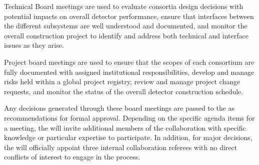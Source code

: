 Technical Board meetings are used to evaluate consortia design
decisions with potential impacts on overall detector performance,
ensure that interfaces between the different subsystems are well
understood and documented, and monitor the overall construction
project to identify and address both technical and interface issues as
they arise.

Project board meetings are used to ensure that the scopes of each
consortium are fully documented with assigned institutional
responsibilities, develop and manage risks held within a global
project registry, review and manage project change requests, and
monitor the status of the overall detector construction schedule.

Any decisions generated through these board meetings are passed to the
  as recommendations for formal approval.
Depending on the specific agenda items for a meeting, the
 will invite additional members of the collaboration
with specific knowledge or particular expertise to participate.  In
addition, for major decisions, the  will officially
appoint three internal collaboration referees with no direct conflicts
of interest to engage in the process.
